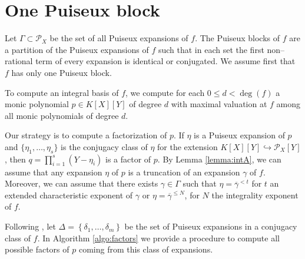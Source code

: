 \documentclass[a4paper,11pt]{amsart}%
\theoremstyle{definition}
\theoremstyle{plain}
\theoremstyle{remark}
\newcommand{\Px}{{\mathcal{P}_X}}
\begin{document}
\section{One Puiseux block}

Let $\Gamma \subset \Px$ be the set of all Puiseux expansions of $f$. The Puiseux blocks of $f$ are a partition of the Puiseux expansions of $f$ such that in each set the first non--rational term of every expansion is identical or conjugated. We assume first that $f$ has only one Puiseux block.

To compute an integral basis of $f$, we compute for each $0 \le d < \deg(f)$ a monic polynomial $p \in K[X][Y]$ of degree $d$ with maximal valuation at $f$ among all monic polynomials of degree $d$.

Our strategy is to compute a factorization of $p$. If $\eta$ is a Puiseux expansion of $p$ and $\{\eta_1, \dots, \eta_s\}$ is the conjugacy class of $\eta$ for the extension $K[X][Y] \hookrightarrow \Px[Y]$, then $q = \prod_{i = 1}^s (Y - \eta_i)$ is a factor of $p$.
By Lemma \ref{lemma:intA}, we can assume that any expansion $\eta$ of $p$ is a truncation of an expansion $\gamma$ of $f$. Moreover, we can assume that there exists $\gamma \in \Gamma$ such that $\eta = \overline{\gamma}^{<t}$ for $t$ an extended characteristic exponent of $\gamma$ or $\eta = \overline{\gamma}^{\le N}$, for $N$ the integrality exponent of $f$.

%

Following \cite[Algorithm 6]{intbas}, let $\Delta=\left\{  \delta_{1},\ldots,\delta_{m}\right\}$ be
the set of Puiseux expansions in a conjugacy class of $f$. In Algorithm \ref{algo:factors} we provide a procedure to compute all possible factors of $p$ coming from this class of expansions.
\end{document}

